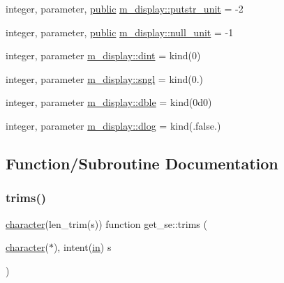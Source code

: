 \begin{DoxyCompactItemize}
\item 
integer, parameter, \hyperlink{M__stopwatch_83_8txt_a2f74811300c361e53b430611a7d1769f}{public} \hyperlink{namespacem__display_a3d9e3532ee7c52476b1d1545b2f73d89}{m\+\_\+display\+::putstr\+\_\+unit} = -\/2
\item 
integer, parameter, \hyperlink{M__stopwatch_83_8txt_a2f74811300c361e53b430611a7d1769f}{public} \hyperlink{namespacem__display_a19eab1ae2710aecb5e6db7c68152d645}{m\+\_\+display\+::null\+\_\+unit} = -\/1
\item 
integer, parameter \hyperlink{namespacem__display_a73f772e9702cad6f40b78364fde2c7cd}{m\+\_\+display\+::dint} = kind(0)
\item 
integer, parameter \hyperlink{namespacem__display_a2ac86bc535c3ccc5947dbb3109c666b5}{m\+\_\+display\+::sngl} = kind(0.)
\item 
integer, parameter \hyperlink{namespacem__display_a46d90b75b6ccef7ccade133e5847e815}{m\+\_\+display\+::dble} = kind(0d0)
\item 
integer, parameter \hyperlink{namespacem__display_a8c6a3df510feabf6bc84dd0a8789f98c}{m\+\_\+display\+::dlog} = kind(.false.)
\end{DoxyCompactItemize}


\subsection{Function/\+Subroutine Documentation}
\mbox{\label{M__display_8f90_a18d4b146c386b49bb8b6512c91988ae3}} 
\subsubsection{\texorpdfstring{trims()}{trims()}}
{\footnotesize\ttfamily \hyperlink{option__stopwatch_83_8txt_abd4b21fbbd175834027b5224bfe97e66}{character}(len\+\_\+trim(s)) function get\+\_\+se\+::trims (\begin{DoxyParamCaption}\item[{\hyperlink{option__stopwatch_83_8txt_abd4b21fbbd175834027b5224bfe97e66}{character}($\ast$), intent(\hyperlink{M__journal_83_8txt_afce72651d1eed785a2132bee863b2f38}{in})}]{s }\end{DoxyParamCaption})\hspace{0.3cm}{\ttfamily [private]}}

